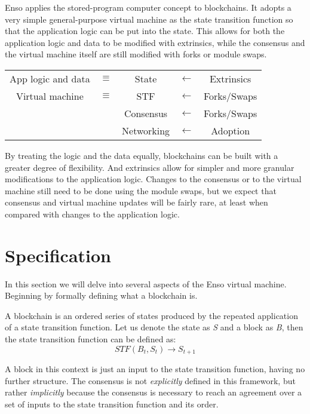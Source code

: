 \documentclass[conference]{IEEEtran}
\begin{document}
Enso applies the stored-program computer concept to blockchains. It adopts a very simple general-purpose virtual machine as the state transition function so that the application logic can be put into the state. This allows for both the application logic and data to be modified with extrinsics, while the consensus and the virtual machine itself are still modified with forks or module swaps.

\begin{center}
	\begin{tabular}{c c c c c}
		App logic and data & $\equiv$ & State & $\leftarrow$ & Extrinsics\\
		\cline{1-1} \cline{3-3}
		Virtual machine & $\equiv$ & STF & $\leftarrow$ & Forks/Swaps\\
		\cline{3-3}
		 &  & Consensus & $\leftarrow$ & Forks/Swaps\\
		\cline{3-3}
		 & & Networking & $\leftarrow$ & Adoption
	\end{tabular}
\end{center}

By treating the logic and the data equally, blockchains can be built with a greater degree of flexibility. And extrinsics allow for simpler and more granular modifications to the application logic. Changes to the consensus or to the virtual machine still need to be done using the module swaps, but we expect that consensus and virtual machine updates will be fairly rare, at least when compared with changes to the application logic.

\section{Specification}
In this section we will delve into several aspects of the Enso virtual machine. Beginning by formally defining what a blockchain is.

A blockchain is an ordered series of states produced by the repeated application of a state transition function. Let us denote the state as \textit{S} and a block as \textit{B}, then the state transition function can be defined as:
\[ STF(B_t, S_t) \to S_{t+1} \]

A block in this context is just an input to the state transition function, having no further structure. The consensus is not \textit{explicitly} defined in this framework, but rather \textit{implicitly} because the consensus is necessary to reach an agreement over a set of inputs to the state transition function and its order.
\end{document}
